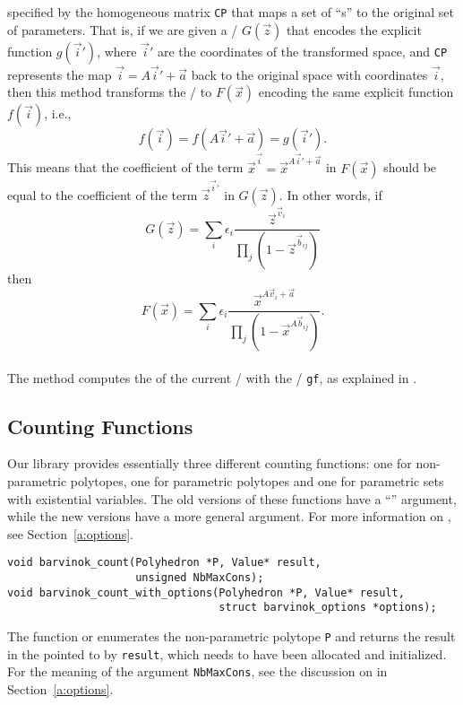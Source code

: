  specified by the homogeneous matrix \verb+CP+
that maps a set of ``s'' 
to the original set of parameters.
That is, if we are given a \rgf/ $G(\vec z)$ that encodes the
explicit function $g(\vec i')$, where $\vec i'$ are the coordinates of
the transformed space, and \verb+CP+ represents the map
$\vec i = A \vec i' + \vec a$ back to the original space with coordinates $\vec i$,
then this method transforms the \rgf/ to $F(\vec x)$ encoding the
same explicit function $f(\vec i)$, i.e., 
$$f(\vec i) = f(A \vec i' + \vec a) = g(\vec i ').$$
This means that the coefficient of the term 
$\vec x^{\vec i} = \vec x^{A \vec i' + \vec a}$ in $F(\vec x)$ should be equal to the
coefficient of the term $\vec z^{\vec i'}$ in $G(\vec z)$.
In other words, if
$$
G(\vec z) =
\sum_i \epsilon_i \frac{\vec z^{\vec v_i}}{\prod_j (1-\vec z^{\vec b_{ij}})}
$$
then
$$
F(\vec x) =
\sum_i \epsilon_i \frac{\vec x^{A \vec v_i + \vec a}}
                       {\prod_j (1-\vec x^{A \vec b_{ij}})}
.
$$
\\
The method  computes the
 of the current \rgf/ with the \rgf/ \verb+gf+,
as explained in .

\subsection{Counting Functions}
\label{a:counting:functions}

Our library provides essentially three different counting functions:
one for non-parametric polytopes, one for parametric polytopes
and one for parametric sets with existential variables.
The old versions of these functions have a ``''
argument, while the new versions have a more general
 argument.
For more information on , see Section~\ref{a:options}.

\begin{verbatim}
void barvinok_count(Polyhedron *P, Value* result, 
                    unsigned NbMaxCons);
void barvinok_count_with_options(Polyhedron *P, Value* result,
                                 struct barvinok_options *options);
\end{verbatim}
The function  or
 enumerates the non-parametric
polytope \verb+P+ and returns the result in the 
pointed to by \verb+result+, which needs to have been allocated
and initialized.
For the meaning of the argument \verb+NbMaxCons+, see
the discussion on  in Section~\ref{a:options}.

